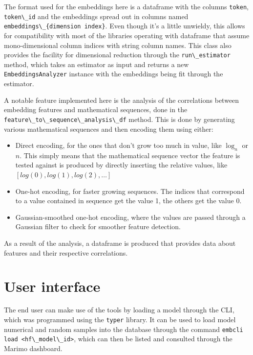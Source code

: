 \documentclass[
  a4paper, twoside, 10pt, titlepage]{book}
\providecommand{\tightlist}{%
  \setlength{\itemsep}{0pt}\setlength{\parskip}{0pt}}
\begin{document}
The format used for the embeddings here is a dataframe with the columns
\passthrough{\lstinline!token!}, \passthrough{\lstinline!token\_id!} and
the embeddings spread out in columns named
\passthrough{\lstinline!embeddings\_\{dimension index\}!}. Even though
it's a little unwieldy, this allows for compatibility with most of the
libraries operating with dataframe that assume mono-dimensional column
indices with string column names. This class also provides the facility
for dimensional reduction through the
\passthrough{\lstinline!run\_estimator!} method, which takes an
estimator as input and returns a new
\passthrough{\lstinline!EmbeddingsAnalyzer!} instance with the
embeddings being fit through the estimator.

A notable feature implemented here is the analysis of the correlations
between embedding features and mathematical sequences, done in the
\passthrough{\lstinline!feature\_to\_sequence\_analysis\_df!} method.
This is done by generating various mathematical sequences and then
encoding them using either:

\begin{itemize}
\tightlist
\item
  Direct encoding, for the ones that don't grow too much in value, like
  \(\log_n\) or \(n\). This simply means that the mathematical sequence
  vector the feature is tested against is produced by directly inserting
  the relative values, like \([log(0), log(1),
  log(2), \ldots]\)
\item
  One-hot encoding, for faster growing sequences. The indices that
  correspond to a value contained in sequence get the value 1, the
  others get the value 0.
\item
  Gaussian-smoothed one-hot encoding, where the values are passed
  through a Gaussian filter to check for smoother feature detection.
\end{itemize}

As a result of the analysis, a dataframe is produced that provides data
about features and their respective correlations.

\section{User interface}\label{user-interface}

The end user can make use of the tools by loading a model through the
CLI, which was programmed using the \passthrough{\lstinline!typer!}
library. It can be used to load model numerical and random samples into
the database through the command
\passthrough{\lstinline!embcli load <hf\_model\_id>!}, which can then be
listed and consulted through the Marimo dashboard.
\end{document}
